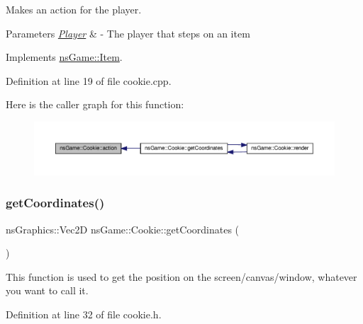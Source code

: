Makes an action for the player. 


\begin{DoxyParams}{Parameters}
{\em \hyperlink{classns_game_1_1_player}{Player}} & -\/ The player that steps on an item \\
\hline
\end{DoxyParams}


Implements \hyperlink{structns_game_1_1_item_af74dffcf9bde4a4297749f4e1852395b}{ns\+Game\+::\+Item}.



Definition at line 19 of file cookie.\+cpp.

Here is the caller graph for this function\+:\nopagebreak
\begin{figure}[H]
\begin{center}
\leavevmode
\includegraphics[width=350pt]{classns_game_1_1_cookie_a2cd4ee8c83b99191643d6e9ef2267b1a_icgraph}
\end{center}
\end{figure}
\mbox{\label{classns_game_1_1_cookie_ab624101d018f74fb856bdfd7fd97c55e}} 
\subsubsection{\texorpdfstring{get\+Coordinates()}{getCoordinates()}}
{\footnotesize\ttfamily ns\+Graphics\+::\+Vec2D ns\+Game\+::\+Cookie\+::get\+Coordinates (\begin{DoxyParamCaption}{ }\end{DoxyParamCaption})\hspace{0.3cm}{\ttfamily [inline]}}



This function is used to get the position on the screen/canvas/window, whatever you want to call it. 



Definition at line 32 of file cookie.\+h.

